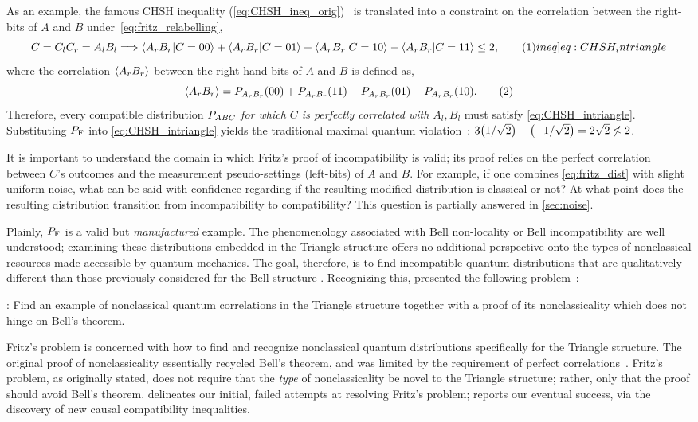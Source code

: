 \documentclass[aps, 10pt, english, twoside, pra, nofootinbib, tightenlines, longbibliography, superscriptaddress]{revtex4-1}
\begin{document}
    As an example, the famous CHSH inequality (\cref{eq:CHSH_ineq_orig})~\cite{CHSH_Original} is translated into a constraint on the correlation between the right-bits of $A$ and $B$ under~\cref{eq:fritz_relabelling},
    \[ C = C_{l}C_{r} = A_{l}B_{l} \Longrightarrow \ba{A_r B_r|C = 00} + \ba{A_r B_r|C = 01} + \ba{A_r B_r|C = 10} - \ba{A_r B_r|C = 11} \leq 2, \eq \label[ineq]{eq:CHSH_intriangle} \]
    where the correlation $\ba{A_r B_r}$ between the right-hand bits of $A$ and $B$ is defined as,
    \[ \ba{A_r B_r} = \prob[A_r B_r][00] + \prob[A_r B_r][11] - \prob[A_r B_r][01] - \prob[A_r B_r][10]. \eq \label{eq:right_bit_correlations} \]
    Therefore, every compatible distribution $\prob[ABC]$ \emph{for which $C$ is perfectly correlated with $A_l,B_l$} must satisfy \cref{eq:CHSH_intriangle}. Substituting $\prob[\fritz]$ into \cref{eq:CHSH_intriangle} yields the traditional maximal quantum violation~\cite{Cirelson_1980}: $3 \br{1/\sqrt{2}} - \br{-1/\sqrt{2}} = 2\sqrt{2} \not \leq 2$.

    It is important to understand the domain in which Fritz's proof of incompatibility is valid; its proof relies on the perfect correlation between $C$'s outcomes and the measurement pseudo-settings (left-bits) of $A$ and $B$. For example, if one combines \cref{eq:fritz_dist} with slight uniform noise, what can be said with confidence regarding if the resulting modified distribution is classical or not? At what point does the resulting distribution transition from incompatibility to compatibility? This question is partially answered in \cref{sec:noise}.

    Plainly, $\prob[\fritz]$ is a valid but \textit{manufactured} example. The phenomenology associated with Bell non-locality or Bell incompatibility are well understood; examining these distributions embedded in the Triangle structure offers no additional perspective onto the types of nonclassical resources made accessible by quantum mechanics. The goal, therefore, is to find incompatible quantum distributions that are qualitatively different than those previously considered for the Bell structure \cite{Gisin_2017}. Recognizing this, \citet{Fritz_2012} presented the following problem~\cite[Problem 2.17]{Fritz_2012}:

    : Find an example of nonclassical quantum correlations in the Triangle structure together with a proof of its nonclassicality which does not hinge on Bell’s theorem.

    Fritz's problem is concerned with how to find and recognize nonclassical quantum distributions specifically for the Triangle structure. The original proof of nonclassicality essentially recycled Bell's theorem, and was limited by the requirement of perfect correlations~\cite{Fritz_2012}. Fritz's problem, as originally stated, does not require that the \emph{type} of nonclassicality be novel to the Triangle structure; rather, only that the proof should avoid Bell's theorem.  delineates our initial, failed attempts at resolving Fritz's problem;  reports our eventual success, via the discovery of new causal compatibility inequalities.
\end{document}
